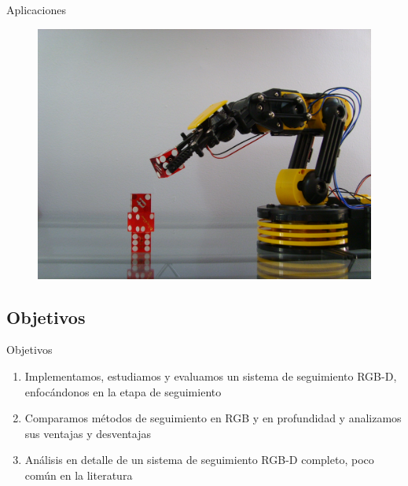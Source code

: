 \documentclass[]{beamer}
\begin{document}
\begin{frame}{Aplicaciones}
    \begin{figure}[t]
        \centering
        \includegraphics[scale=0.12]{img/robot.jpg}
    \end{figure}
\end{frame}


\subsection{Objetivos}
\begin{frame}{Objetivos}

    \begin{enumerate}
        \item Implementamos, estudiamos y evaluamos un sistema de seguimiento RGB-D, enfocándonos en la etapa de seguimiento
        \item Comparamos métodos de seguimiento en RGB y en profundidad y analizamos sus ventajas y desventajas
        \item Análisis en detalle de un sistema de seguimiento RGB-D completo, poco común en la literatura
    \end{enumerate}
\end{frame}
\end{document}
